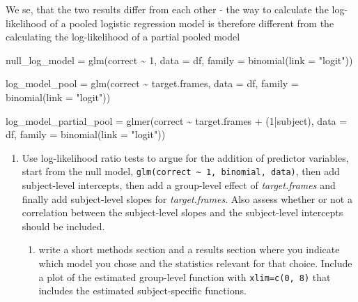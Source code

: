 \documentclass[
]{article}
\newenvironment{Shaded}{\begin{snugshade}}{\end{snugshade}}
\newcommand{\AttributeTok}[1]{\textcolor[rgb]{0.77,0.63,0.00}{#1}}
\newcommand{\DecValTok}[1]{\textcolor[rgb]{0.00,0.00,0.81}{#1}}
\newcommand{\FunctionTok}[1]{\textcolor[rgb]{0.00,0.00,0.00}{#1}}
\newcommand{\NormalTok}[1]{#1}
\newcommand{\OtherTok}[1]{\textcolor[rgb]{0.56,0.35,0.01}{#1}}
\newcommand{\SpecialCharTok}[1]{\textcolor[rgb]{0.00,0.00,0.00}{#1}}
\newcommand{\StringTok}[1]{\textcolor[rgb]{0.31,0.60,0.02}{#1}}
\providecommand{\tightlist}{%
  \setlength{\itemsep}{0pt}\setlength{\parskip}{0pt}}
\begin{document}
We se, that the two results differ from each other - the way to
calculate the log-likelihood of a pooled logistic regression model is
therefore different from the calculating the log-likelihood of a partial
pooled model

\begin{Shaded}
\begin{Highlighting}[]
\NormalTok{null\_log\_model }\OtherTok{=} \FunctionTok{glm}\NormalTok{(correct }\SpecialCharTok{\textasciitilde{}} \DecValTok{1}\NormalTok{, }\AttributeTok{data =}\NormalTok{ df, }\AttributeTok{family =} \FunctionTok{binomial}\NormalTok{(}\AttributeTok{link =} \StringTok{"logit"}\NormalTok{))}

\NormalTok{log\_model\_pool }\OtherTok{=} \FunctionTok{glm}\NormalTok{(correct }\SpecialCharTok{\textasciitilde{}}\NormalTok{ target.frames, }\AttributeTok{data =}\NormalTok{ df, }\AttributeTok{family =} \FunctionTok{binomial}\NormalTok{(}\AttributeTok{link =} \StringTok{"logit"}\NormalTok{))}

\NormalTok{log\_model\_partial\_pool }\OtherTok{=} \FunctionTok{glmer}\NormalTok{(correct }\SpecialCharTok{\textasciitilde{}}\NormalTok{ target.frames }\SpecialCharTok{+}\NormalTok{ (}\DecValTok{1}\SpecialCharTok{|}\NormalTok{subject), }\AttributeTok{data =}\NormalTok{ df, }\AttributeTok{family =} \FunctionTok{binomial}\NormalTok{(}\AttributeTok{link =} \StringTok{"logit"}\NormalTok{))}
\end{Highlighting}
\end{Shaded}

\begin{enumerate}
\def\labelenumi{\arabic{enumi})}
\setcounter{enumi}{1}
\tightlist
\item
  Use log-likelihood ratio tests to argue for the addition of predictor
  variables, start from the null model,
  \texttt{glm(correct\ \textasciitilde{}\ 1,\ \textquotesingle{}binomial\textquotesingle{},\ data)},
  then add subject-level intercepts, then add a group-level effect of
  \emph{target.frames} and finally add subject-level slopes for
  \emph{target.frames}. Also assess whether or not a correlation between
  the subject-level slopes and the subject-level intercepts should be
  included.

  \begin{enumerate}
  \def\labelenumii{\roman{enumii}.}
  \tightlist
  \item
    write a short methods section and a results section where you
    indicate which model you chose and the statistics relevant for that
    choice. Include a plot of the estimated group-level function with
    \texttt{xlim=c(0,\ 8)} that includes the estimated subject-specific
    functions.
  \end{enumerate}
\end{enumerate}
\end{document}
